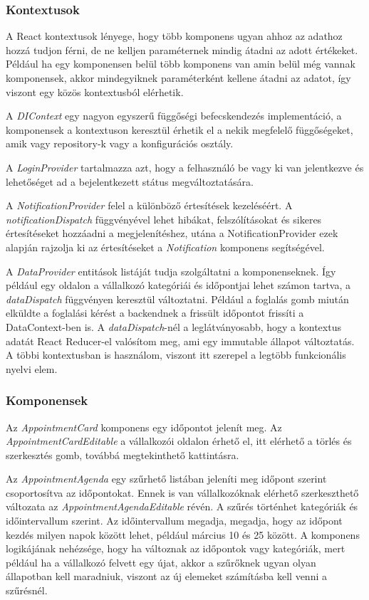 \subsubsection{Kontextusok}

A React kontextusok lényege, hogy több komponens ugyan ahhoz az adathoz hozzá tudjon férni, de ne kelljen paraméternek mindig átadni az adott értékeket. Például ha egy komponensen belül több komponens van amin belül még vannak komponensek, akkor mindegyiknek paraméterként kellene átadni az adatot, így viszont egy közös kontextusból elérhetik.

A \textit{DIContext} egy nagyon egyszerű függőségi befecskendezés implementáció, a komponensek a kontextuson keresztül érhetik el a nekik megfelelő függőségeket, amik vagy repository-k vagy a konfigurációs osztály.

A \textit{LoginProvider} tartalmazza azt, hogy a felhasználó be vagy ki van jelentkezve és lehetőséget ad a bejelentkezett státus megváltoztatására.

A \textit{NotificationProvider} felel a különböző értesítések kezeléséért. A \textit{notificationDispatch} függvényével lehet hibákat, felszólításokat és sikeres értesítéseket hozzáadni a megjelenítéshez, utána a NotificationProvider ezek alapján rajzolja ki az értesítéseket a \textit{Notification} komponens segítségével.

A \textit{DataProvider} entitások listáját tudja szolgáltatni a komponenseknek. Így például egy oldalon a vállalkozó kategóriái és időpontjai lehet számon tartva, a \textit{dataDispatch} függvényen keresztül változtatni. Például a foglalás gomb miután elküldte a foglalási kérést a backendnek a frissült időpontot frissíti a DataContext-ben is. A \textit{dataDispatch}-nél a leglátványosabb, hogy a kontextus adatát  React Reducer-el valósítom meg, ami egy immutable állapot változtatás. A többi kontextusban is használom, viszont itt szerepel a legtöbb funkcionális nyelvi elem. 

\subsubsection{Komponensek}

Az \textit{AppointmentCard} komponens egy időpontot jelenít meg. Az \textit{AppointmentCardEditable} a vállalkozói oldalon érhető el, itt elérhető a törlés és szerkesztés gomb, továbbá megtekinthető kattintásra.

Az \textit{AppointmentAgenda} egy szűrhető listában jeleníti meg időpont szerint csoportosítva az időpontokat. Ennek is van vállalkozóknak elérhető szerkeszthető változata az \textit{AppointmentAgendaEditable} révén. A szűrés történhet kategóriák és időintervallum szerint. Az időintervallum megadja, megadja, hogy az időpont kezdés milyen napok között lehet, például március 10 és 25 között. A komponens logikájának nehézsége, hogy ha változnak az időpontok vagy kategóriák, mert például ha a vállalkozó felvett egy újat, akkor a szűrőknek ugyan olyan állapotban kell maradniuk, viszont az új elemeket számításba kell venni a szűrésnél.

